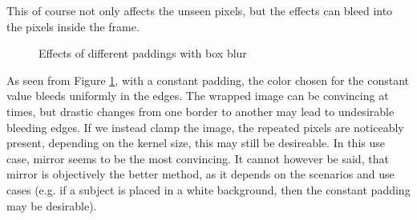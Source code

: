 \documentclass[twoside,a4paper,article]{combine}
\begin{document}
This of course not only affects the unseen pixels, but the effects can bleed into the pixels inside the frame.
\begin{minipage}{\textwidth}\begin{figure}[H]
    \centering
    \caption{Effects of different paddings with box blur}
    \label{fig:boxBlur_borders}
\end{figure}\end{minipage}

As seen from Figure \ref{fig:boxBlur_borders}, with a constant padding, the color chosen for the constant value bleeds uniformly in the edges. The wrapped image
can be convincing at times, but drastic changes from one border to another may lead to undesirable bleeding edges. If we instead clamp the image, the repeated pixels are noticeably
present, depending on the kernel size, this may still be desireable. In this use case, mirror seems to be the most convincing. It cannot however be said, that mirror is objectively the better
method, as it depends on the scenarios and use cases (e.g. if a subject is placed in a white background, then the constant padding may be desirable).
\end{document}
